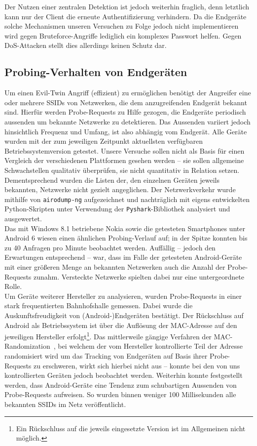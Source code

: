 Der Nutzen einer zentralen Detektion ist jedoch weiterhin fraglich, denn letztlich kann nur der Client die erneute Authentifizierung verhindern. Da die Endgeräte solche Mechanismen unseren Versuchen zu Folge jedoch nicht implementieren wird gegen Bruteforce-Angriffe lediglich ein komplexes Passwort helfen. Gegen DoS-Attacken stellt dies allerdings keinen Schutz dar.

\subsection{Probing-Verhalten von Endgeräten}\label{subs:praxisprobes}
Um einen Evil-Twin Angriff (effizient) zu ermöglichen benötigt der Angreifer eine oder mehrere SSIDs von Netzwerken, die dem anzugreifenden Endgerät bekannt sind.
Hierfür werden Probe-Requests zu Hilfe gezogen, die Endgeräte periodisch aussenden um bekannte Netzwerke zu detektieren.
Das Aussenden variiert jedoch hinsichtlich Frequenz und Umfang, ist also abhängig vom Endgerät.
Alle Geräte wurden mit der zum jeweiligen Zeitpunkt aktuellsten verfügbaren Betriebssystemversion getestet. Unsere Versuche sollen nicht als Basis für einen Vergleich der verschiedenen Plattformen gesehen werden -- sie sollen allgemeine Schwachstellen qualitativ überprüfen, sie nicht quantitativ in Relation setzen. Dementsprechend wurden die Listen der, den einzelnen Geräten jeweils bekannten, Netzwerke nicht gezielt angeglichen. Der Netzwerkverkehr wurde mithilfe von \texttt{airodump-ng} aufgezeichnet und nachträglich mit eigens entwickelten Python-Skripten unter Verwendung der \texttt{Pyshark}-Bibliothek analysiert und ausgewertet.\\

Das mit Windows 8.1 betriebene Nokia sowie die getesteten Smartphones unter Android 6 wiesen einen ähnlichen Probing-Verlauf auf; in der Spitze konnten bis zu 40 Anfragen pro Minute beobachtet werden.
Auffällig -- jedoch den Erwartungen entsprechend -- war, dass im Falle der getesteten Android-Geräte mit einer größeren Menge an bekannten Netzwerken auch die Anzahl der Probe-Requests zunahm. Versteckte Netzwerke spielten dabei nur eine untergeordnete Rolle.\\

Um Geräte weiterer Hersteller zu analysieren, wurden Probe-Requests in einer stark frequentierten Bahnhofshalle gemessen. Dabei wurde die Auskunftsfreudigkeit von (Android-)Endgeräten bestätigt. Der Rückschluss auf Android als Betriebssystem ist über die Auflösung der MAC-Adresse auf den jeweiligen Hersteller erfolgt\footnote{Ein Rückschluss auf die jeweils eingesetzte Version ist im Allgemeinen nicht möglich.}.
Das mittlerweile gängige Verfahren der MAC-Randomization~\cite{android6changes, windows10wireless}, bei welchem der vom Hersteller kontrollierte Teil der Adresse randomisiert wird um das Tracking von Endgeräten auf Basis ihrer Probe-Requests zu erschweren, wirkt sich hierbei nicht aus -- konnte bei den von uns kontrollierten Geräten jedoch beobachtet werden.
Weiterhin konnte festgestellt werden, dass Android-Geräte eine Tendenz zum schubartigen Aussenden von Probe-Requests aufweisen.
So wurden binnen weniger 100 Millisekunden alle bekannten SSIDs im Netz veröffentlicht.\\

